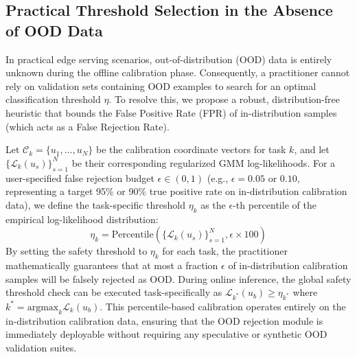 \subsection{Practical Threshold Selection in the Absence of OOD Data}
In practical edge serving scenarios, out-of-distribution (OOD) data is entirely unknown during the offline calibration phase. Consequently, a practitioner cannot rely on validation sets containing OOD examples to search for an optimal classification threshold $\eta$. To resolve this, we propose a robust, distribution-free heuristic that bounds the False Positive Rate (FPR) of in-distribution samples (which acts as a False Rejection Rate).

Let $\mathcal{C}_k = \{u_1, \dots, u_N\}$ be the calibration coordinate vectors for task $k$, and let $\{\mathcal{L}_k(u_s)\}_{s=1}^N$ be their corresponding regularized GMM log-likelihoods. For a user-specified false rejection budget $\epsilon \in (0, 1)$ (e.g., $\epsilon = 0.05$ or $0.10$, representing a target 95\% or 90\% true positive rate on in-distribution calibration data), we define the task-specific threshold $\eta_k$ as the $\epsilon$-th percentile of the empirical log-likelihood distribution:
\begin{equation}
    \eta_k = \text{Percentile}\left( \{\mathcal{L}_k(u_s)\}_{s=1}^N, \epsilon \times 100 \right)
\end{equation}
By setting the safety threshold to $\eta_k$ for each task, the practitioner mathematically guarantees that at most a fraction $\epsilon$ of in-distribution calibration samples will be falsely rejected as OOD. During online inference, the global safety threshold check can be executed task-specifically as $\mathcal{L}_{k^*}(u_b) \ge \eta_{k^*}$ where $k^* = \text{argmax}_k \mathcal{L}_k(u_b)$. This percentile-based calibration operates entirely on the in-distribution calibration data, ensuring that the OOD rejection module is immediately deployable without requiring any speculative or synthetic OOD validation suites.
